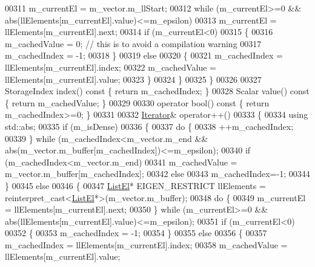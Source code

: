 \begin{DoxyCode}
00311         m\_currentEl = m\_vector.m\_llStart;
00312         \textcolor{keywordflow}{while} (m\_currentEl>=0 && abs(llElements[m\_currentEl].value)<=m\_epsilon)
00313           m\_currentEl = llElements[m\_currentEl].next;
00314         \textcolor{keywordflow}{if} (m\_currentEl<0)
00315         \{
00316           m\_cachedValue = 0; \textcolor{comment}{// this is to avoid a compilation warning}
00317           m\_cachedIndex = -1;
00318         \}
00319         \textcolor{keywordflow}{else}
00320         \{
00321           m\_cachedIndex = llElements[m\_currentEl].index;
00322           m\_cachedValue = llElements[m\_currentEl].value;
00323         \}
00324       \}
00325     \}
00326 
00327     StorageIndex index()\textcolor{keyword}{ const }\{ \textcolor{keywordflow}{return} m\_cachedIndex; \}
00328     Scalar value()\textcolor{keyword}{ const }\{ \textcolor{keywordflow}{return} m\_cachedValue; \}
00329 
00330     \textcolor{keyword}{operator} bool()\textcolor{keyword}{ const }\{ \textcolor{keywordflow}{return} m\_cachedIndex>=0; \}
00331 
00332     \hyperlink{class_eigen_1_1internal_1_1_ambi_vector_1_1_iterator}{Iterator}& operator++()
00333     \{
00334       \textcolor{keyword}{using} std::abs;
00335       \textcolor{keywordflow}{if} (m\_isDense)
00336       \{
00337         \textcolor{keywordflow}{do} \{
00338           ++m\_cachedIndex;
00339         \} \textcolor{keywordflow}{while} (m\_cachedIndex<m\_vector.m\_end && abs(m\_vector.m\_buffer[m\_cachedIndex])<=m\_epsilon);
00340         \textcolor{keywordflow}{if} (m\_cachedIndex<m\_vector.m\_end)
00341           m\_cachedValue = m\_vector.m\_buffer[m\_cachedIndex];
00342         \textcolor{keywordflow}{else}
00343           m\_cachedIndex=-1;
00344       \}
00345       \textcolor{keywordflow}{else}
00346       \{
00347         \hyperlink{struct_eigen_1_1internal_1_1_ambi_vector_1_1_list_el}{ListEl}* EIGEN\_RESTRICT llElements = \textcolor{keyword}{reinterpret\_cast<}\hyperlink{struct_eigen_1_1internal_1_1_ambi_vector_1_1_list_el}{ListEl}*\textcolor{keyword}{>}(m\_vector.m\_buffer);
00348         \textcolor{keywordflow}{do} \{
00349           m\_currentEl = llElements[m\_currentEl].next;
00350         \} \textcolor{keywordflow}{while} (m\_currentEl>=0 && abs(llElements[m\_currentEl].value)<=m\_epsilon);
00351         \textcolor{keywordflow}{if} (m\_currentEl<0)
00352         \{
00353           m\_cachedIndex = -1;
00354         \}
00355         \textcolor{keywordflow}{else}
00356         \{
00357           m\_cachedIndex = llElements[m\_currentEl].index;
00358           m\_cachedValue = llElements[m\_currentEl].value;

\end{DoxyCode}
